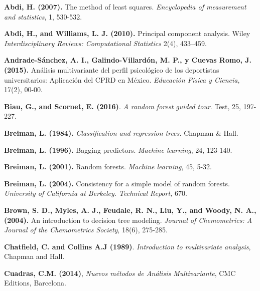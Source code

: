 
\begin{thebibliography}{99}
	

\textbf{Abdi, H. (2007).} The method of least squares. \emph{Encyclopedia of measurement and statistics}, 1, 530-532.


 \textbf{Abdi, H., and Williams, L. J. (2010).} Principal component analysis. Wiley \emph{Interdisciplinary Reviews: Computational Statistics}  2(4), 433–459. 


\textbf{Andrade-Sánchez, A. I., Galindo-Villardón, M. P., y Cuevas Romo, J. (2015).} Análisis multivariante del perfil psicológico de los deportistas universitarios: Aplicación del CPRD en México. \emph{Educación Física y Ciencia}, 17(2), 00-00.


\textbf{Biau, G., and Scornet, E. (2016)}. \textit{A random forest guided tour}. Test, 25, 197-227.

\textbf{Breiman, L. (1984).} \emph{Classification and regression trees. }Chapman \& Hall.

\textbf{Breiman, L. (1996).} Bagging predictors. \emph{Machine learning}, 24, 123-140.

\textbf{Breiman, L. (2001).} Random forests. \emph{Machine learning}, 45, 5-32.

\textbf{Breiman, L. (2004).} Consistency for a simple model of random forests. \emph{University of California at Berkeley. Technical Report,} 670.

 \textbf{Brown, S. D.,  Myles, A. J., Feudale, R. N., Liu, Y., and Woody, N. A.,  (2004).} An introduction to decision tree modeling. \emph{Journal of Chemometrics: A Journal of the Chemometrics Society}, 18(6), 275-285.

 \textbf{Chatfield, C. and Collins A.J (1989)}. {\em Introduction to multivariate analysis}, Chapman and Hall.

 \textbf{Cuadras, C.M. (2014)}, \textit{Nuevos métodos de Análisis Multivariante}, CMC Editions, Barcelona. 


\end{thebibliography}
